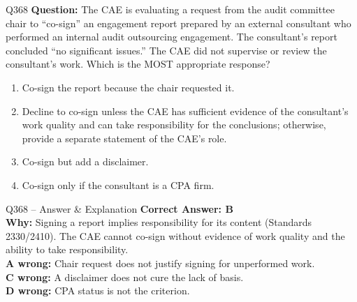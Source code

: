 \documentclass[aspectratio=169,10pt]{beamer}
\begin{document}
	\begin{frame}[t]{Q368}
		\small
		\textbf{Question:} The CAE is evaluating a request from the audit committee chair to ``co-sign'' an engagement report prepared by an external consultant who performed an internal audit outsourcing engagement. The consultant's report concluded ``no significant issues.'' The CAE did not supervise or review the consultant's work. Which is the MOST appropriate response?
		\begin{enumerate}[label=\Alph*.,itemsep=1pt,topsep=2pt]
			\item Co-sign the report because the chair requested it.
			\item Decline to co-sign unless the CAE has sufficient evidence of the consultant's work quality and can take responsibility for the conclusions; otherwise, provide a separate statement of the CAE's role.
			\item Co-sign but add a disclaimer.
			\item Co-sign only if the consultant is a CPA firm.
		\end{enumerate}
	\end{frame}
	
	\begin{frame}[t]{Q368 -- Answer \& Explanation}
		\small
		\textbf{Correct Answer: B} \\[4pt]
		\textbf{Why:} Signing a report implies responsibility for its content (Standards 2330/2410). The CAE cannot co-sign without evidence of work quality and the ability to take responsibility. \\[4pt]
		\textbf{A wrong:} Chair request does not justify signing for unperformed work. \\[2pt]
		\textbf{C wrong:} A disclaimer does not cure the lack of basis. \\[2pt]
		\textbf{D wrong:} CPA status is not the criterion.
	\end{frame}
	
\end{document}
